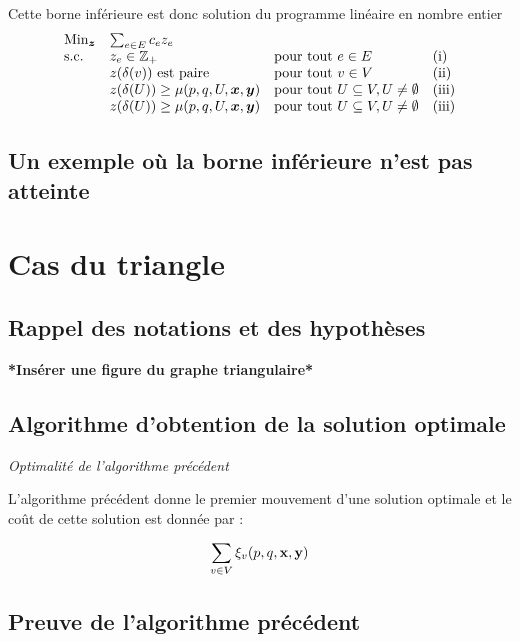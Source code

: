 \documentclass[twoside,11pt,openany,a4paper]{rapport}
\begin{document}
Cette borne inférieure est donc solution du programme linéaire en nombre entier
\[
\begin{array}{llll}
  \text{Min}_{\boldsymbol{z}} &\sum_{e \in E} c_ez_e & & \\
  \text{s.c.}       &z_e \in \mathbb{Z}_+ &\text{pour tout } e \in E &\text{(i)} \\
                    &z(\delta(v)) \text{ est paire} &\text{pour tout } v \in V &\text{(ii)} \\
                    &z(\delta(U)) \ge \mu(p,q,U,\boldsymbol{x},\boldsymbol{y}) &\text{pour tout } U \subseteq V, U \ne \emptyset &\text{(iii)} \\
                    &z(\delta(U)) \ge \mu(p,q,U,\boldsymbol{x},\boldsymbol{y}) &\text{pour tout } U \subseteq V, U \ne \emptyset &\text{(iii)}
\end{array}
\]

\section{Un exemple où la borne inférieure n'est pas atteinte}

\chapter{Cas du triangle}
\label{Cas du Triangle}

\section{Rappel des notations et des hypothèses}

\textbf{*Insérer une figure du graphe triangulaire*}


\section{Algorithme d'obtention de la solution optimale}

\begin{thm}
\emph{Optimalité de l'algorithme précédent}

L'algorithme précédent donne le premier mouvement d'une solution optimale et le coût de cette solution est donnée par :

$$\sum_{v \in V}\xi_v(p,q,\bf{x},\bf{y})$$
\end{thm}

\section{Preuve de l'algorithme précédent}
\end{document}
